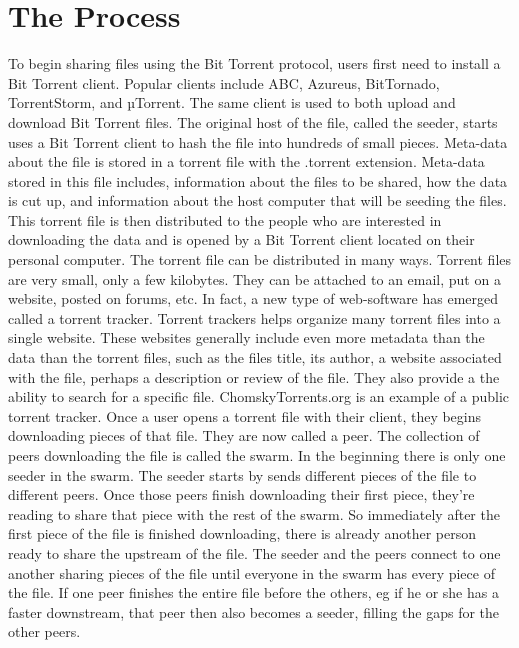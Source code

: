 \documentclass[a4paper,12pt]{report}
\begin{document}
\section{The Process}
To begin sharing files using the Bit Torrent protocol, users first need to install a Bit Torrent client. 
Popular clients include ABC, Azureus, BitTornado, TorrentStorm, and µTorrent. The same client is used to both upload and download Bit Torrent files.
The original host of the file, called the seeder, starts uses a Bit Torrent client to hash the file into hundreds of small pieces. 
Meta-data about the file is stored in a torrent file with the .torrent extension. 
Meta-data stored in this file includes, information about the files to be shared, how the data is cut up, and information about the host computer that will be seeding the files. 
This torrent file is then distributed to the people who are interested in downloading the data and is opened by a Bit Torrent client located on their personal computer. 
The torrent file can be distributed in many ways. 
Torrent files are very small, only a few kilobytes. They can be attached to an email, put on a website, posted on forums, etc. 
In fact, a new type of web-software has emerged called a torrent tracker.
Torrent trackers helps organize many torrent files into a single website. These websites generally include even more metadata than the data than the torrent files, such as the files title, its author, a website associated with the file, perhaps a description or review of the file. 
They also provide a the ability to search for a specific file. ChomskyTorrents.org is an example of a public torrent tracker.
Once a user opens a torrent file with their client, they begins downloading pieces of that file. 
They are now called a peer. 
The collection of peers downloading the file is called the swarm. 
In the beginning there is only one seeder in the swarm. 
The seeder starts by sends different pieces of the file to different peers. Once those peers finish downloading their first piece, they’re reading to share that piece with the rest of the swarm. 
So immediately after the first piece of the file is finished downloading, there is already another person ready to share the upstream of the file. 
The seeder and the peers connect to one another sharing pieces of the file until everyone in the swarm has every piece of the file. 
If one peer finishes the entire file before the others, eg if he or she has a faster downstream, that peer then also becomes a seeder, filling the gaps for the other peers.
\end{document}
